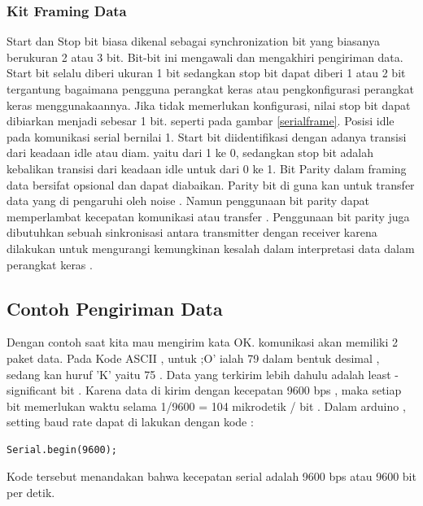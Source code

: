 \subsubsection{Kit Framing Data}
Start dan Stop bit biasa dikenal sebagai synchronization bit yang biasanya berukuran 2 atau 3 bit. Bit-bit ini mengawali dan mengakhiri pengiriman data. Start bit selalu diberi ukuran 1 bit sedangkan stop bit dapat diberi 1 atau 2 bit tergantung bagaimana pengguna perangkat keras atau pengkonfigurasi perangkat keras menggunakaannya. Jika tidak memerlukan konfigurasi, nilai stop bit dapat dibiarkan menjadi sebesar 1 bit. seperti pada gambar \ref{serialframe}.
Posisi idle pada komunikasi serial bernilai 1. Start bit diidentifikasi dengan adanya transisi dari keadaan idle atau diam. yaitu dari 1 ke 0, sedangkan stop bit adalah kebalikan transisi dari keadaan idle untuk dari 0 ke 1.
Bit Parity dalam framing data bersifat opsional dan dapat diabaikan. Parity bit di guna kan untuk transfer data yang di pengaruhi oleh noise . Namun penggunaan bit parity dapat memperlambat kecepatan komunikasi atau transfer . Penggunaan bit parity juga dibutuhkan sebuah sinkronisasi antara transmitter dengan receiver karena dilakukan untuk mengurangi kemungkinan kesalah dalam interpretasi data dalam perangkat keras .

\subsection{Contoh Pengiriman Data}
Dengan contoh saat kita mau mengirim kata OK. komunikasi akan memiliki 2 paket data. Pada Kode ASCII , untuk ;O' ialah 79 dalam bentuk desimal , sedang kan huruf 'K' yaitu 75 . Data yang terkirim lebih dahulu adalah least - significant bit . Karena data di kirim dengan kecepatan 9600 bps , maka setiap bit memerlukan waktu selama 1/9600 = 104 mikrodetik / bit . Dalam arduino , setting baud rate dapat di lakukan dengan kode :
\begin{verbatim}
Serial.begin(9600);
\end{verbatim}
Kode tersebut menandakan bahwa kecepatan serial adalah 9600 bps atau 9600 bit per detik.

